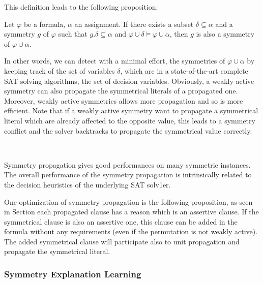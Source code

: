 This definition leads to the following proposition:

\begin{proposition}
	Let $\varphi$ be a formula, $\alpha $ an assignment. If
	there exists a subset $\delta \subseteq \alpha $ and a symmetry $g$ of $\varphi$ such that 
	$g.\delta \subseteq \alpha $ and $\varphi \cup \delta \models \varphi \cup \alpha$, then $g$ 
	is also a symmetry of $\varphi \cup \alpha $.
\end{proposition}


In other words, we can detect with a minimal effort, the symmetries of $\varphi
\cup \alpha$ by keeping track of the set of variables $\delta$, which are 
in a state-of-the-art complete SAT solving algorithms, the set of decision variables.
Obviously, a weakly active symmetry can also propagate the symmetrical literals of a propagated one.
Moreover, weakly active symmetries allows more propagation and so is more efficient.
Note that if a weakly active symmetry want to propagate a symmetrical literal which are already affected to the 
opposite value, this leads to a symmetry conflict and the solver backtracks to propagate the symmetrical value correctly.

\\

Symmetry propagation gives good performances on many symmetric instances.
The overall performance of the symmetry propagation is intrinsically related to the decision heuristics of
the underlying SAT solv1er.

One optimization of symmetry propagation is the following proposition, as seen in Section
 each propagated clause has a reason which is an assertive clause.
If the symmetrical clause is also an assertive one, this clause can be added in the formula without any requirements
(even if the permutation is not weakly active). The added symmetrical clause will participate also to unit propagation and propagate the symmetrical literal.


\subsubsection{Symmetry Explanation Learning}


